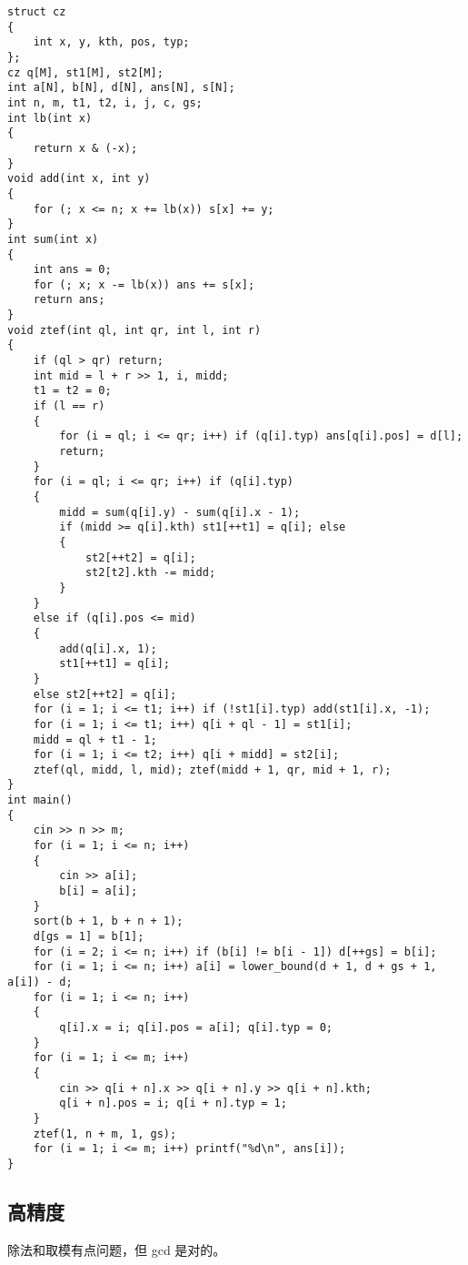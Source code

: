 \documentclass[12pt]{ctexart}
\begin{document}
\begin{lstlisting}
struct cz
{
	int x, y, kth, pos, typ;
};
cz q[M], st1[M], st2[M];
int a[N], b[N], d[N], ans[N], s[N];
int n, m, t1, t2, i, j, c, gs;
int lb(int x)
{
	return x & (-x);
}
void add(int x, int y)
{
	for (; x <= n; x += lb(x)) s[x] += y;
}
int sum(int x)
{
	int ans = 0;
	for (; x; x -= lb(x)) ans += s[x];
	return ans;
}
void ztef(int ql, int qr, int l, int r)
{
	if (ql > qr) return;
	int mid = l + r >> 1, i, midd;
	t1 = t2 = 0;
	if (l == r)
	{
		for (i = ql; i <= qr; i++) if (q[i].typ) ans[q[i].pos] = d[l];
		return;
	}
	for (i = ql; i <= qr; i++) if (q[i].typ)
	{
		midd = sum(q[i].y) - sum(q[i].x - 1);
		if (midd >= q[i].kth) st1[++t1] = q[i]; else
		{
			st2[++t2] = q[i];
			st2[t2].kth -= midd;
		}
	}
	else if (q[i].pos <= mid)
	{
		add(q[i].x, 1);
		st1[++t1] = q[i];
	}
	else st2[++t2] = q[i];
	for (i = 1; i <= t1; i++) if (!st1[i].typ) add(st1[i].x, -1);
	for (i = 1; i <= t1; i++) q[i + ql - 1] = st1[i];
	midd = ql + t1 - 1;
	for (i = 1; i <= t2; i++) q[i + midd] = st2[i];
	ztef(ql, midd, l, mid); ztef(midd + 1, qr, mid + 1, r);
}
int main()
{
	cin >> n >> m;
	for (i = 1; i <= n; i++)
	{
		cin >> a[i];
		b[i] = a[i];
	}
	sort(b + 1, b + n + 1);
	d[gs = 1] = b[1];
	for (i = 2; i <= n; i++) if (b[i] != b[i - 1]) d[++gs] = b[i];
	for (i = 1; i <= n; i++) a[i] = lower_bound(d + 1, d + gs + 1, a[i]) - d;
	for (i = 1; i <= n; i++)
	{
		q[i].x = i; q[i].pos = a[i]; q[i].typ = 0;
	}
	for (i = 1; i <= m; i++)
	{
		cin >> q[i + n].x >> q[i + n].y >> q[i + n].kth;
		q[i + n].pos = i; q[i + n].typ = 1;
	}
	ztef(1, n + m, 1, gs);
	for (i = 1; i <= m; i++) printf("%d\n", ans[i]);
}
\end{lstlisting}

\subsection{高精度}

除法和取模有点问题，但 gcd 是对的。
\end{document}
